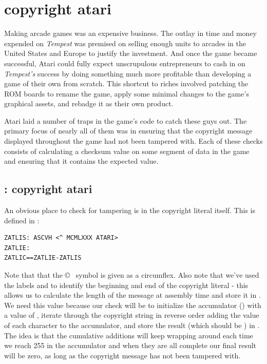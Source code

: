 \chapter{copyright atari}
\label{sec:copyprotection}
\lhead[tempest]{}
\lstset{style=6502Style}
\vspace{-0.4cm}

Making arcade games was an expensive business. The outlay in time and 
money expended on \textit{Tempest} was premised on selling enough units
to arcades in the United States and Europe to justify the investment. And once
the game became successful, Atari could fully expect unscrupulous entrepreneurs to
cash in on \textit{Tempest's} success by doing something much more profitable
than developing a game of their own from scratch. This shortcut to riches
involved patching the ROM boards to rename the game, apply some minimal
changes to the game's graphical assets, and rebadge it as their own product.

Atari laid a number of traps in the game's code to catch these guys out. The 
primary focus of nearly all of them was in ensuring that the copyright message
displayed throughout the game had not been tampered with. Each of these checks
consists of calculating a checksum value on some segment of data in the game and
ensuring that it contains the expected value.

\section*{: copyright atari}
An obvious place to check for tampering is in the copyright literal itself. This
is defined in :
\begin{lstlisting}
ZATLIS: ASCVH <^ MCMLXXX ATARI>
ZATLIE:
ZATLIC==ZATLIE-ZATLIS
\end{lstlisting}

Note that that the \copyright~  symbol is given as a circumflex. Also note that we've used
the labels  and  to identify the beginning and end of the
copyright literal - this allows us to calculate the length of the message at assembly
time and store it in . We need this value because our check will be
to initialize the accumulator () with a value of , iterate through the copyright
string in reverse order adding the value of each character to the accumulator, and store the result 
(which should be ) in . The idea is that the cumulative additions will keep
wrapping around each time we reach 255 in the accumulator and when they are all complete our final
result will be zero, as long as the copyright message has not been tampered with.

